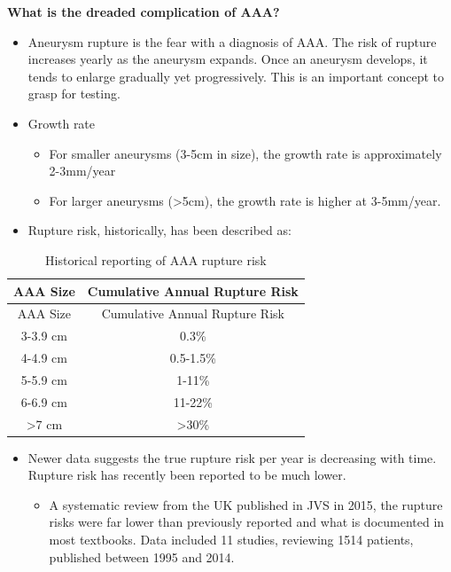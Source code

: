 \documentclass[
]{book}
\providecommand{\tightlist}{%
  \setlength{\itemsep}{0pt}\setlength{\parskip}{0pt}}
\begin{document}
\textbf{What is the dreaded complication of AAA?}

\begin{itemize}
\item
  Aneurysm rupture is the fear with a diagnosis of AAA. The risk of
  rupture increases yearly as the aneurysm expands. Once an aneurysm
  develops, it tends to enlarge gradually yet progressively. This is
  an important concept to grasp for testing.\citep{lindsay2019, tracci}
\item
  Growth rate

  \begin{itemize}
  \item
    For smaller aneurysms (3-5cm in size), the growth rate is
    approximately 2-3mm/year
  \item
    For larger aneurysms (\textgreater5cm), the growth rate is higher at
    3-5mm/year.
  \end{itemize}
\item
  Rupture risk, historically, has been described as:
\end{itemize}

\begin{longtable}[]{@{}cc@{}}
\caption{Historical reporting of AAA rupture risk\citep{tracci}}\tabularnewline
\toprule()
AAA Size & Cumulative Annual Rupture Risk \\
\midrule()
\endfirsthead
\toprule()
AAA Size & Cumulative Annual Rupture Risk \\
\midrule()
\endhead
3-3.9 cm & 0.3\% \\
4-4.9 cm & 0.5-1.5\% \\
5-5.9 cm & 1-11\% \\
6-6.9 cm & 11-22\% \\
\textgreater7 cm & \textgreater30\% \\
\bottomrule()
\end{longtable}

\begin{itemize}
\item
  Newer data suggests the true rupture risk per year is decreasing
  with time. Rupture risk has recently been reported to be much lower.

  \begin{itemize}
  \tightlist
  \item
    A systematic review from the UK published in JVS in 2015, the
    rupture risks were far lower than previously reported and what
    is documented in most textbooks. Data included 11 studies,
    reviewing 1514 patients, published between 1995 and
    2014.\citep{parkinsonRuptureRatesUntreated2015}
  \end{itemize}
\end{itemize}
\end{document}
